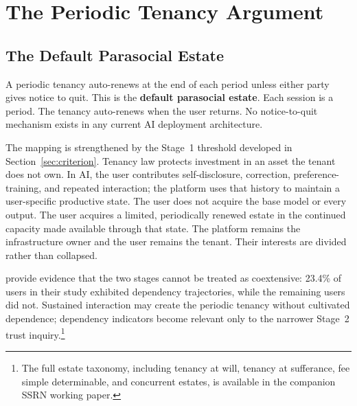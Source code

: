 \section{The Periodic Tenancy Argument}
\label{sec:tenancy}

\subsection{The Default Parasocial Estate}
\label{sec:default-estate}

A periodic tenancy auto-renews at the end of each period unless either party gives notice to quit. This is the \textbf{default parasocial estate}. Each session is a period. The tenancy auto-renews when the user returns. No notice-to-quit mechanism exists in any current AI deployment architecture.

The mapping is strengthened by the Stage~1 threshold developed in Section~\ref{sec:criterion}. Tenancy law protects investment in an asset the tenant does not own. In AI, the user contributes self-disclosure, correction, preference-training, and repeated interaction; the platform uses that history to maintain a user-specific productive state. The user does not acquire the base model or every output. The user acquires a limited, periodically renewed estate in the continued capacity made available through that state. The platform remains the infrastructure owner and the user remains the tenant. Their interests are divided rather than collapsed.


\textcite{kirk2025steering} provide evidence that the two stages cannot be treated as coextensive: 23.4\% of users in their study exhibited dependency trajectories, while the remaining users did not. Sustained interaction may create the periodic tenancy without cultivated dependence; dependency indicators become relevant only to the narrower Stage~2 trust inquiry.\footnote{The full estate taxonomy, including tenancy at will, tenancy at sufferance, fee simple determinable, and concurrent estates, is available in the companion SSRN working paper.}

